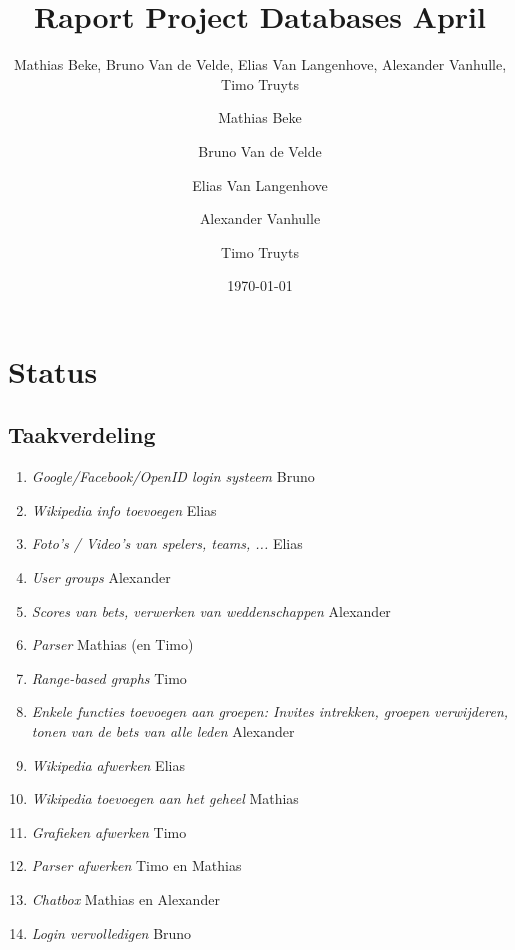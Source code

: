\documentclass[11pt]{article}
\title{Raport Project Databases April}
\author{Mathias Beke, Bruno Van de Velde, Elias Van Langenhove, Alexander Vanhulle, Timo Truyts}
\author{
  Mathias Beke
  \and
  Bruno Van de Velde
  \and
  Elias Van Langenhove
  \and
  Alexander Vanhulle
  \and
  Timo Truyts
}
\date{\today}
\begin{document}
\rhead{}



\maketitle


\tableofcontents





\section{Status}




\subsection{Taakverdeling}


\begin{enumerate}
    
   \item \emph{Google/Facebook/OpenID login systeem} Bruno
   
   \item \emph{Wikipedia info toevoegen} Elias
   
   \item \emph{Foto's / Video's van spelers, teams, ...} Elias
   
   \item \emph{User groups} Alexander
   
   \item \emph{Scores van bets, verwerken van weddenschappen} Alexander
   
   \item \emph{Parser} Mathias (en Timo)
   
   \item \emph {Range-based graphs} Timo
   
   \item \emph{Enkele functies toevoegen aan groepen: Invites intrekken, groepen verwijderen, tonen van de bets van alle leden} Alexander
      
   \item \emph{Wikipedia afwerken} Elias
   
   \item \emph{Wikipedia toevoegen aan het geheel} Mathias
   
   \item \emph{Grafieken afwerken} Timo 
   
   \item \emph{Parser afwerken} Timo en Mathias        
   
   \item \emph{Chatbox} Mathias en Alexander
    
   \item \emph{Login vervolledigen} Bruno   
    
\end{enumerate}
\end{document}
